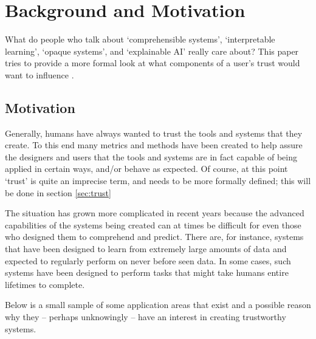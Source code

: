 \section{Background and Motivation} \label{sec:background}

What do people who talk about `comprehensible systems', `interpretable learning', `opaque systems', and `explainable AI' really care about? This paper tries to provide a more formal look at what components of a user's trust  would want to influence . 

\subsection{Motivation}
    Generally, humans have always wanted to trust the tools and systems that they create.  To this end many metrics and methods have been created to help assure the designers and users that the tools and systems are in fact capable of being applied in certain ways, and/or behave as expected. Of course, at this point `trust' is quite an imprecise term, and needs to be more formally defined; this will be done in section \ref{sec:trust}

    The situation has grown more complicated in recent years because the advanced capabilities of the systems being created can at times be difficult for even those who designed them to comprehend and predict. There are, for instance, systems that have been designed to learn from extremely large amounts of data and expected to regularly perform on never before seen data. In some cases, such systems have been designed to perform tasks that might take humans entire lifetimes to complete. 

    Below is a small sample of some application areas that exist and a possible reason why they -- perhaps unknowingly -- have an interest in creating trustworthy systems.
    
